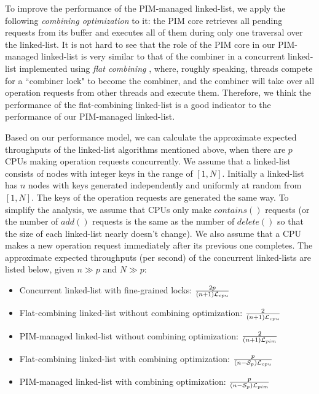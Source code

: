 To improve the performance of the PIM-managed linked-list,
we apply the following \textit{combining optimization} to it:
the PIM core retrieves all pending requests from its buffer and
executes all of them during only one traversal over the linked-list.
It is not hard to see that the role of the PIM core in our PIM-managed linked-list
is very similar to that of the combiner in a concurrent linked-list implemented
using \textit{flat combining} \cite{Hendler10}, where, roughly speaking,
threads compete for a ``combiner lock" to become the combiner, and
the combiner will take over all operation requests from other threads and execute them.
Therefore, we think the performance of the flat-combining linked-list is a good indicator to
the performance of our PIM-managed linked-list.

Based on our performance model, we can calculate the approximate expected
throughputs of the linked-list algorithms mentioned above, 
when there are $p$ CPUs making operation requests concurrently.
We assume that a linked-list consists of nodes with integer keys in the range of $[1, N]$.
Initially a linked-list has $n$ nodes with keys generated independently
and uniformly at random from $[1, N]$.
The keys of the operation requests are generated the same way.
To simplify the analysis, we assume that CPUs only make $contains()$ requests
(or the number of $add()$ requests is the same as the number of $delete()$
so that the size of each linked-list nearly doesn't change).
We also assume that a CPU makes a new operation request immediately after
its previous one completes.
The approximate expected throughputs (per second) of the concurrent linked-lists
are listed below, given $n \gg p$ and $N \gg p$: 
\begin{itemize}
\item Concurrent linked-list with fine-grained locks:
	${2p \over (n+1)\mathcal{L}_{cpu}}$

\item Flat-combining linked-list without combining optimization: 
	${2 \over (n+1)\mathcal{L}_{cpu}}$

\item PIM-managed linked-list without combining optimization:
	${2 \over (n+1)\mathcal{L}_{pim}}$

\item Flat-combining linked-list with combining optimization:
    ${p \over (n-\mathcal{S}_{p})\mathcal{L}_{cpu}}$

\item PIM-managed linked-list with combining optimization:
    ${p \over (n-\mathcal{S}_{p})\mathcal{L}_{pim}}$
\end{itemize}
